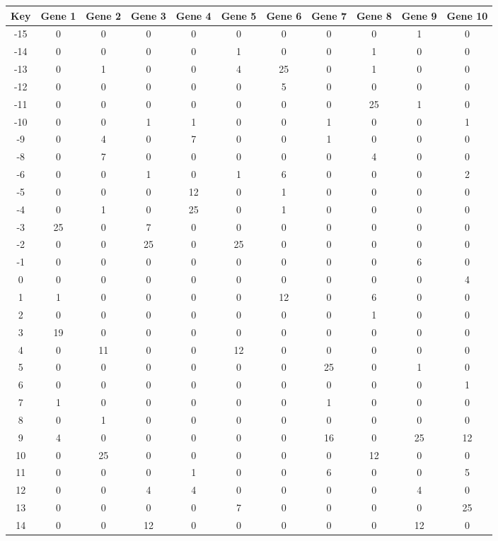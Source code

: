 \begin{tabular}{|c|c|c|c|c|c|c|c|c|c|c|}
\hline
Key & Gene 1 & Gene 2 & Gene 3 & Gene 4 & Gene 5 & Gene 6 & Gene 7 & Gene 8 & Gene 9 & Gene 10 \\
\hline
-15 & 0 & 0 & 0 & 0 & 0 & 0 & 0 & 0 & 1 & 0 \\
-14 & 0 & 0 & 0 & 0 & 1 & 0 & 0 & 1 & 0 & 0 \\
-13 & 0 & 1 & 0 & 0 & 4 & 25 & 0 & 1 & 0 & 0 \\
-12 & 0 & 0 & 0 & 0 & 0 & 5 & 0 & 0 & 0 & 0 \\
-11 & 0 & 0 & 0 & 0 & 0 & 0 & 0 & 25 & 1 & 0 \\
-10 & 0 & 0 & 1 & 1 & 0 & 0 & 1 & 0 & 0 & 1 \\
-9 & 0 & 4 & 0 & 7 & 0 & 0 & 1 & 0 & 0 & 0 \\
-8 & 0 & 7 & 0 & 0 & 0 & 0 & 0 & 4 & 0 & 0 \\
-6 & 0 & 0 & 1 & 0 & 1 & 6 & 0 & 0 & 0 & 2 \\
-5 & 0 & 0 & 0 & 12 & 0 & 1 & 0 & 0 & 0 & 0 \\
-4 & 0 & 1 & 0 & 25 & 0 & 1 & 0 & 0 & 0 & 0 \\
-3 & 25 & 0 & 7 & 0 & 0 & 0 & 0 & 0 & 0 & 0 \\
-2 & 0 & 0 & 25 & 0 & 25 & 0 & 0 & 0 & 0 & 0 \\
-1 & 0 & 0 & 0 & 0 & 0 & 0 & 0 & 0 & 6 & 0 \\
0 & 0 & 0 & 0 & 0 & 0 & 0 & 0 & 0 & 0 & 4 \\
1 & 1 & 0 & 0 & 0 & 0 & 12 & 0 & 6 & 0 & 0 \\
2 & 0 & 0 & 0 & 0 & 0 & 0 & 0 & 1 & 0 & 0 \\
3 & 19 & 0 & 0 & 0 & 0 & 0 & 0 & 0 & 0 & 0 \\
4 & 0 & 11 & 0 & 0 & 12 & 0 & 0 & 0 & 0 & 0 \\
5 & 0 & 0 & 0 & 0 & 0 & 0 & 25 & 0 & 1 & 0 \\
6 & 0 & 0 & 0 & 0 & 0 & 0 & 0 & 0 & 0 & 1 \\
7 & 1 & 0 & 0 & 0 & 0 & 0 & 1 & 0 & 0 & 0 \\
8 & 0 & 1 & 0 & 0 & 0 & 0 & 0 & 0 & 0 & 0 \\
9 & 4 & 0 & 0 & 0 & 0 & 0 & 16 & 0 & 25 & 12 \\
10 & 0 & 25 & 0 & 0 & 0 & 0 & 0 & 12 & 0 & 0 \\
11 & 0 & 0 & 0 & 1 & 0 & 0 & 6 & 0 & 0 & 5 \\
12 & 0 & 0 & 4 & 4 & 0 & 0 & 0 & 0 & 4 & 0 \\
13 & 0 & 0 & 0 & 0 & 7 & 0 & 0 & 0 & 0 & 25 \\
14 & 0 & 0 & 12 & 0 & 0 & 0 & 0 & 0 & 12 & 0 \\
\hline
\end{tabular}